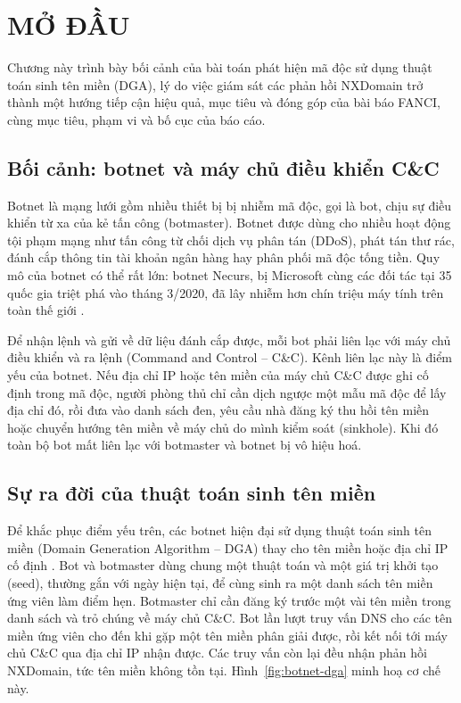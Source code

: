 \section{MỞ ĐẦU}\label{chap:mo-dau}

Chương này trình bày bối cảnh của bài toán phát hiện mã độc sử dụng thuật toán sinh tên miền (DGA), lý do việc giám sát các phản hồi NXDomain trở thành một hướng tiếp cận hiệu quả, mục tiêu và đóng góp của bài báo FANCI, cùng mục tiêu, phạm vi và bố cục của báo cáo.

\subsection{Bối cảnh: botnet và máy chủ điều khiển C\&C}\label{sec:boi-canh}

Botnet là mạng lưới gồm nhiều thiết bị bị nhiễm mã độc, gọi là bot, chịu sự điều khiển từ xa của kẻ tấn công (botmaster). Botnet được dùng cho nhiều hoạt động tội phạm mạng như tấn công từ chối dịch vụ phân tán (DDoS), phát tán thư rác, đánh cắp thông tin tài khoản ngân hàng hay phân phối mã độc tống tiền. Quy mô của botnet có thể rất lớn: botnet Necurs, bị Microsoft cùng các đối tác tại 35 quốc gia triệt phá vào tháng 3/2020, đã lây nhiễm hơn chín triệu máy tính trên toàn thế giới \cite{microsoft2020necurs}.

Để nhận lệnh và gửi về dữ liệu đánh cắp được, mỗi bot phải liên lạc với máy chủ điều khiển và ra lệnh (Command and Control -- C\&C). Kênh liên lạc này là điểm yếu của botnet. Nếu địa chỉ IP hoặc tên miền của máy chủ C\&C được ghi cố định trong mã độc, người phòng thủ chỉ cần dịch ngược một mẫu mã độc để lấy địa chỉ đó, rồi đưa vào danh sách đen, yêu cầu nhà đăng ký thu hồi tên miền hoặc chuyển hướng tên miền về máy chủ do mình kiểm soát (sinkhole). Khi đó toàn bộ bot mất liên lạc với botmaster và botnet bị vô hiệu hoá.

\subsection{Sự ra đời của thuật toán sinh tên miền}\label{sec:su-ra-doi-dga}

Để khắc phục điểm yếu trên, các botnet hiện đại sử dụng thuật toán sinh tên miền (Domain Generation Algorithm -- DGA) thay cho tên miền hoặc địa chỉ IP cố định \cite{plohmann2016dga,schuppen2018fanci}. Bot và botmaster dùng chung một thuật toán và một giá trị khởi tạo (seed), thường gắn với ngày hiện tại, để cùng sinh ra một danh sách tên miền ứng viên làm điểm hẹn. Botmaster chỉ cần đăng ký trước một vài tên miền trong danh sách và trỏ chúng về máy chủ C\&C. Bot lần lượt truy vấn DNS cho các tên miền ứng viên cho đến khi gặp một tên miền phân giải được, rồi kết nối tới máy chủ C\&C qua địa chỉ IP nhận được. Các truy vấn còn lại đều nhận phản hồi NXDomain, tức tên miền không tồn tại. Hình~\ref{fig:botnet-dga} minh hoạ cơ chế này.

